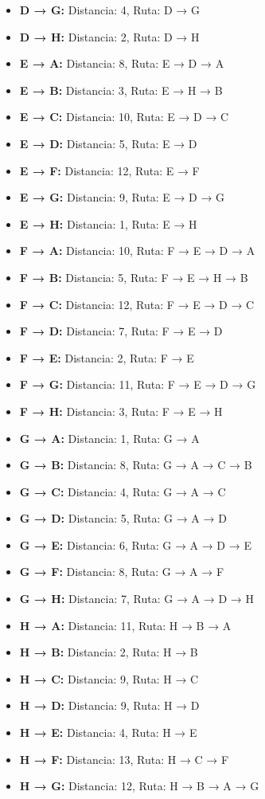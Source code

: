 \documentclass[12pt]{article}
\begin{document}
\begin{itemize}
\item \textbf{D → G:} Distancia: 4, Ruta: D → G
\item \textbf{D → H:} Distancia: 2, Ruta: D → H
\item \textbf{E → A:} Distancia: 8, Ruta: E → D → A
\item \textbf{E → B:} Distancia: 3, Ruta: E → H → B
\item \textbf{E → C:} Distancia: 10, Ruta: E → D → C
\item \textbf{E → D:} Distancia: 5, Ruta: E → D
\item \textbf{E → F:} Distancia: 12, Ruta: E → F
\item \textbf{E → G:} Distancia: 9, Ruta: E → D → G
\item \textbf{E → H:} Distancia: 1, Ruta: E → H
\item \textbf{F → A:} Distancia: 10, Ruta: F → E → D → A
\item \textbf{F → B:} Distancia: 5, Ruta: F → E → H → B
\item \textbf{F → C:} Distancia: 12, Ruta: F → E → D → C
\item \textbf{F → D:} Distancia: 7, Ruta: F → E → D
\item \textbf{F → E:} Distancia: 2, Ruta: F → E
\item \textbf{F → G:} Distancia: 11, Ruta: F → E → D → G
\item \textbf{F → H:} Distancia: 3, Ruta: F → E → H
\item \textbf{G → A:} Distancia: 1, Ruta: G → A
\item \textbf{G → B:} Distancia: 8, Ruta: G → A → C → B
\item \textbf{G → C:} Distancia: 4, Ruta: G → A → C
\item \textbf{G → D:} Distancia: 5, Ruta: G → A → D
\item \textbf{G → E:} Distancia: 6, Ruta: G → A → D → E
\item \textbf{G → F:} Distancia: 8, Ruta: G → A → F
\item \textbf{G → H:} Distancia: 7, Ruta: G → A → D → H
\item \textbf{H → A:} Distancia: 11, Ruta: H → B → A
\item \textbf{H → B:} Distancia: 2, Ruta: H → B
\item \textbf{H → C:} Distancia: 9, Ruta: H → C
\item \textbf{H → D:} Distancia: 9, Ruta: H → D
\item \textbf{H → E:} Distancia: 4, Ruta: H → E
\item \textbf{H → F:} Distancia: 13, Ruta: H → C → F
\item \textbf{H → G:} Distancia: 12, Ruta: H → B → A → G
\end{itemize}
\end{document}
